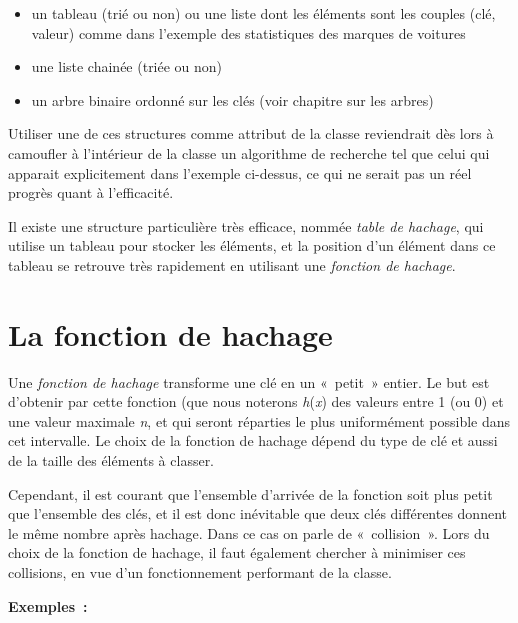 	\begin{itemize}
		\item {
			un tableau (trié ou non) ou une liste dont les éléments sont 
			les couples (clé, valeur) comme dans l'exemple des
			statistiques des marques de voitures}
		\item {
			une liste chainée (triée ou non)}
		\item {
			un arbre binaire ordonné sur les clés (voir chapitre sur les arbres)}
	\end{itemize}
	
	Utiliser une de ces structures comme attribut de la classe 
	reviendrait dès lors à camoufler à l'intérieur de la classe
	un algorithme de recherche tel que celui qui apparait explicitement 
	dans l'exemple ci-dessus, ce qui ne serait pas un
	réel progrès quant à l'efficacité.

	Il existe une structure particulière très efficace, nommée 
	\textit{table de hachage}, qui utilise un tableau pour
	stocker les éléments, et la position d'un élément dans ce 
	tableau se retrouve très rapidement en utilisant une
	\textit{fonction de hachage}.


\section{La fonction de hachage}

	Une \textit{fonction de hachage} transforme une clé 
	en un «~petit~» entier. Le but est d'obtenir par cette
	fonction (que nous noterons \textit{h}(\textit{x}) des 
	valeurs entre 1 (ou 0) et une valeur maximale \textit{n}, 
	et qui seront réparties le plus uniformément possible dans 
	cet intervalle. Le choix de la fonction de hachage dépend du 
	type de clé et aussi de la taille des éléments à classer.

	Cependant, il est courant que l'ensemble d'arrivée de la 
	fonction soit plus petit que l'ensemble des clés, et il est
	donc inévitable que deux clés différentes donnent le même 
	nombre après hachage. Dans ce cas on parle de «~collision~».
	Lors du choix de la fonction de hachage, il faut également 
	chercher à minimiser ces collisions, en vue d'un
	fonctionnement performant de la classe.

	\textbf{Exemples~:}

